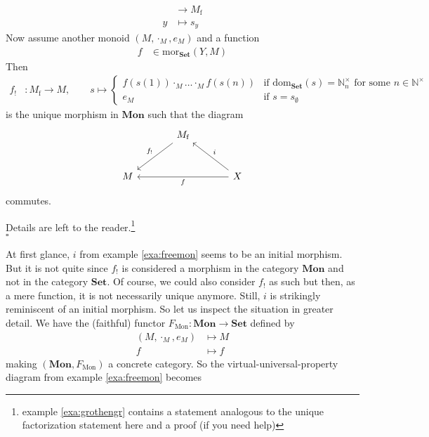 \begin{exa}
\begin{align*}
  &\rightarrow
  M_{\textrm{f}}
  \\
  y
  &\mapsto
  s_{y}
\end{align*}
Now assume another monoid $(M,\cdot_{M},e_{M})$ and a function
\begin{align*}
  f
  &\in
  \mathrm{mor}_{\mathbf{Set}}(Y,M)
\end{align*}
Then
\begin{align*}
  f_{!}
  &\colon
  M_{\textrm{f}}
  \rightarrow
  M
  ,\qquad
  s
  \mapsto
  \begin{cases}
    f(s(1))
    \cdot_{M}
    \ldots
    \cdot_{M}
    f(s(n))
    &
    \text{if }
    \mathrm{dom}_{\mathbf{Set}}(s)
    =
    \mathbb{N}_{n}^{\times}
    \text{ for some }
    n
    \in
    \mathbb{N}^{\times}
    \\
    e_{M}
    &
    \text{if }
    s
    =
    s_{\emptyset}
  \end{cases}
\end{align*}
is the unique morphism in $\mathbf{Mon}$ such that the diagram
\[
\begin{tikzcd}[sep=large]
  &
  M_{\textrm{f}}
  \arrow[swap]{dl}{f_{!}}
  &
  \\
  M
  &
  &
  X
  \arrow{ll}{f}
  \arrow[swap]{lu}{i}
\end{tikzcd}
\]
commutes.
\end{exa}
\begin{prf}
Details are left to the reader.\footnote{example \ref{exa:grothengr} contains a statement analogous to the unique factorization statement here and a proof (if you need help)}
\\
\phantom{proven}
\hfill
$\square$
\end{prf}
At first glance, $i$ from example \ref{exa:freemon} seems to be an initial morphism. But it is not quite since $f_{!}$ is considered a morphism in the category $\mathbf{Mon}$ and not in the category $\mathbf{Set}$. Of course, we could also consider $f_{!}$ as such but then, as a mere function, it is not necessarily unique anymore. Still, $i$ is strikingly reminiscent of an initial morphism. So let us inspect the situation in greater detail. We have the (faithful) functor $F_{\textrm{Mon}} \colon \mathbf{Mon} \rightarrow \mathbf{Set}$ defined by
\begin{align*}
  (M,\cdot_{M},e_{M})
  &\mapsto
  M
  \\
  f
  &\mapsto
  f
\end{align*}
making $(\mathbf{Mon},F_{\textrm{Mon}})$ a concrete category. So the virtual-universal-property diagram from example \ref{exa:freemon} becomes
